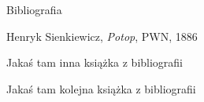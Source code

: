 \documentclass[aspectratio=169,xcolor=dvipsnames, t]{beamer}
\begin{document}
\begin{frame}{Bibliografia}
    \footnotesize{
    \begin{thebibliography}{5}
        Henryk Sienkiewicz,
        \emph{Potop},
        PWN,
        1886
        
        Jakaś tam inna książka z bibliografii
        
        Jakaś tam kolejna książka z bibliografii
        
    \end{thebibliography}
    }
\end{frame}


\makefinalpage
\end{document}
